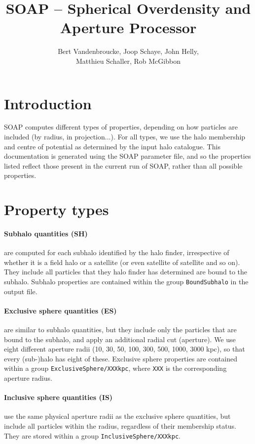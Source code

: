 \documentclass{article}
\title{SOAP -- Spherical Overdensity and Aperture Processor}
\author{Bert Vandenbroucke, Joop Schaye, John Helly, \\Matthieu Schaller, Rob McGibbon}
\date{}
\begin{document}
\maketitle



\section{Introduction}

SOAP computes different types of properties, depending on  how particles are included (by radius, in projection...). 
For all types, we use the halo membership and centre of potential as determined by the input halo catalogue. 
This documentation is generated using the SOAP parameter file, and so the properties listed reflect those
present in the current run of SOAP, rather than all possible properties.

\section{Property types}

\paragraph{Subhalo quantities (SH)} are computed for each subhalo identified by the halo finder, irrespective of whether 
it is a field halo or a satellite (or even satellite of satellite and so on). They include all particles 
that they halo finder has determined are bound to the subhalo. Subhalo properties are contained within the group 
\verb+BoundSubhalo+ in the output file.

\paragraph{Exclusive sphere quantities (ES)} are similar to subhalo quantities, but they include only the 
particles that are bound to the subhalo, and apply an additional radial cut (aperture). We use eight 
different aperture radii (10, 30, 50, 100, 300, 500, 1000, 3000 kpc), so that every (sub-)halo has eight of 
these. Exclusive sphere properties are contained within a group \verb+ExclusiveSphere/XXXkpc+, where 
\verb+XXX+ is the corresponding aperture radius.

\paragraph{Inclusive sphere quantities (IS)} use the same physical aperture radii as the exclusive sphere 
quantities, but include all particles within the radius, regardless of their membership status. They are
stored within a group \verb+InclusiveSphere/XXXkpc+.
\end{document}
